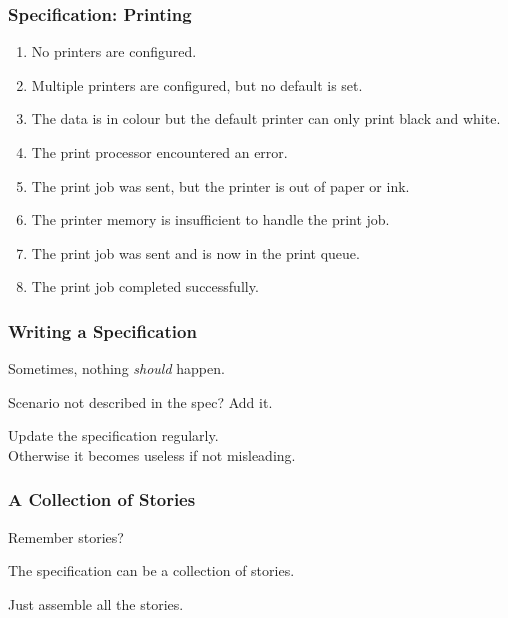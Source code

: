 \begin{frame}
\frametitle{Specification: Printing}
		
		\begin{enumerate}
			\item No printers are configured.
			\item Multiple printers are configured, but no default is set.
			\item The data is in colour but the default printer can only print black and white.
			\item The print processor encountered an error.
			\item The print job was sent, but the printer is out of paper or ink.
			\item The printer memory is insufficient to handle the print job.
			\item The print job was sent and is now in the print queue.
			\item The print job completed successfully.
		\end{enumerate}
				
\end{frame}

\begin{frame}
\frametitle{Writing a Specification}

	\begin{changemargin}{1cm}
		Sometimes, nothing \emph{should} happen. 
		
	Scenario not described in the spec? Add it. 
	
	Update the specification regularly.\\
	Otherwise it becomes useless if not misleading. 
		
	\end{changemargin}
\end{frame}

\begin{frame}
\frametitle{A Collection of Stories}
\begin{changemargin}{1cm}
Remember stories?

The specification can be a collection of stories.

Just assemble all the stories.

\end{changemargin}
\end{frame}


